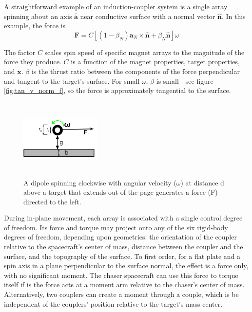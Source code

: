 \documentclass{article}
\begin{document}
A straightforward example of an induction-coupler system is a single array spinning about an axis $\hat{\boldsymbol{a}}$ near conductive surface with a normal vector $\hat{\boldsymbol{n}}$. In this example, the force is 
\begin{equation}\label{eq:singlemagforce}
\textbf{F} = C\left[  \left(1-\beta_N \right )\boldsymbol{a}_N{\times}\hat{\boldsymbol{n}} + \beta_N\hat{\boldsymbol{n}} \right ] \omega
\end{equation}

The factor $C$ scales spin speed of specific magnet arrays to the magnitude of the force they produce. $C$ is a function of the magnet properties, target properties, and $\boldsymbol{x}$. $\beta$ is the thrust ratio between the components of the force perpendicular and tangent to the target's surface. For small $\omega$, $\beta$ is small - see figure \ref{fig:tan_v_norm_f}, so the force is approximately tangential to the surface.

\begin{figure}\label{fig:arry_force_diagram}
\includegraphics[width = 4cm, height = 4cm ]{figures/force_diagram.png}

\caption{A dipole spinning clockwise with angular velocity ($\omega$) at distance d above a target that extends out of the page generates a force (F) directed to the left.}
\end{figure}

During in-plane movement, each array is associated with a single control degree of freedom. Its force and torque may project onto any of the six rigid-body degrees of freedom, depending upon geometries: the orientation of the coupler relative to the spacecraft’s ‎center ‎of ‎mass, ‎distance between the coupler and the surface, and the topography of the surface. To first order, for a flat plate and a spin axis in a plane perpendicular to the surface normal, the effect is a force only, with no significant moment. The chaser spacecraft can use this force to torque itself if is the force acts at a moment arm relative to the chaser’s center of mass. Alternatively, two couplers can create a moment through a couple, which is be independent of‎ the‎ couplers’‎ position relative to‎ the‎ target’s‎ mass‎ center.
\end{document}
